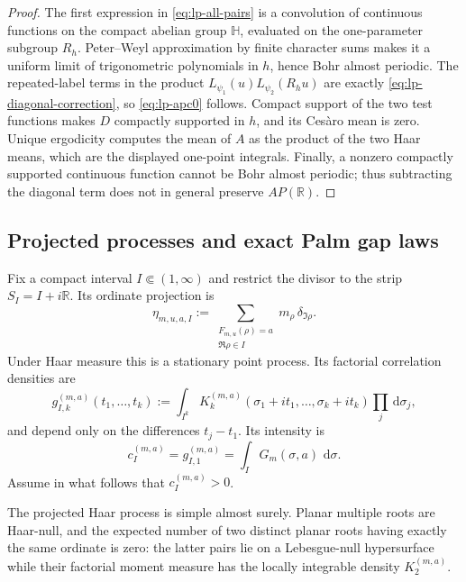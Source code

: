 \documentclass[11pt]{article}
\theoremstyle{definition}
\theoremstyle{remark}
\newcommand{\dd}{\,\mathrm d}
\newcommand{\R}{\mathbb R}
\begin{document}
\begin{proof}
The first expression in \eqref{eq:lp-all-pairs} is a convolution of continuous
functions on the compact abelian group $\mathbb H$, evaluated on the
one-parameter subgroup $R_h$.  Peter--Weyl approximation by finite character
sums makes it a uniform limit of trigonometric polynomials in $h$, hence Bohr
almost periodic.  The repeated-label terms in the product
$L_{\psi_1}(u)L_{\psi_2}(R_hu)$ are exactly
\eqref{eq:lp-diagonal-correction}, so \eqref{eq:lp-apc0} follows.  Compact
support of the two test functions makes $D$ compactly supported in $h$, and its
Ces\`aro mean is zero.  Unique ergodicity computes the mean of $A$ as the
product of the two Haar means, which are the displayed one-point integrals.
Finally, a nonzero compactly supported continuous function cannot be Bohr
almost periodic; thus subtracting the diagonal term does not in general
preserve $AP(\R)$.
\end{proof}

\subsection{Projected processes and exact Palm gap laws}

Fix a compact interval $I\Subset(1,\infty)$ and restrict the divisor to the
strip $S_I=I+i\R$.  Its ordinate projection is
\begin{equation}
 \eta_{m,u,a,I}:=\sum_{\substack{F_{m,u}(\rho)=a\\\Re\rho\in I}}
 m_\rho\,\delta_{\Im\rho}.
 \label{eq:lp-projected}
\end{equation}
Under Haar measure this is a stationary point process.  Its factorial
correlation densities are
\begin{equation}
 g_{I,k}^{(m,a)}(t_1,\ldots,t_k)
 :=\int_{I^k}K_k^{(m,a)}(\sigma_1+it_1,\ldots,
                         \sigma_k+it_k)\prod_j\dd\sigma_j,
 \label{eq:lp-projected-k}
\end{equation}
and depend only on the differences $t_j-t_1$.  Its intensity is
\begin{equation}
 c_I^{(m,a)}=g_{I,1}^{(m,a)}=\int_I G_m(\sigma,a)\,\dd\sigma.
 \label{eq:lp-intensity}
\end{equation}
Assume in what follows that $c_I^{(m,a)}>0$.

The projected Haar process is simple almost surely.  Planar multiple roots are
Haar-null, and the expected number of two distinct planar roots having exactly
the same ordinate is zero: the latter pairs lie on a Lebesgue-null hypersurface
while their factorial moment measure has the locally integrable density
$K_2^{(m,a)}$.
\end{document}
